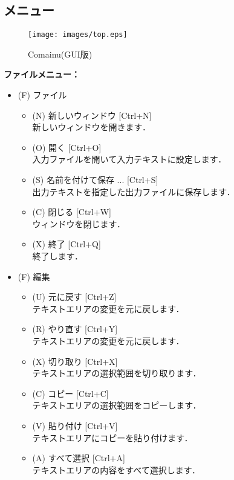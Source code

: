 \documentclass[titlepage]{jarticle}
\begin{document}
\subsection{メニュー}

\begin{figure}[!ht]
\begin{center}
\texttt{[image: images/top.eps]}
\caption{Comainu(GUI版)}
\label{top}
\end{center}
\end{figure}

\textbf{ファイルメニュー：}
\begin{itemize}
\item (F) ファイル
\begin{itemize}
\item (N) 新しいウィンドウ [Ctrl+N] \\
新しいウィンドウを開きます．
\item (O) 開く [Ctrl+O] \\
入力ファイルを開いて入力テキストに設定します．
\item (S) 名前を付けて保存 ... [Ctrl+S] \\
出力テキストを指定した出力ファイルに保存します．
\item (C) 閉じる [Ctrl+W] \\
ウィンドウを閉じます．
\item (X) 終了 [Ctrl+Q] \\
終了します．
\end{itemize}
\item (F) 編集
\begin{itemize}
\item (U) 元に戻す [Ctrl+Z] \\
テキストエリアの変更を元に戻します．
\item (R) やり直す [Ctrl+Y] \\
テキストエリアの変更を元に戻します．
\item (X) 切り取り [Ctrl+X] \\
テキストエリアの選択範囲を切り取ります．
\item (C) コピー [Ctrl+C] \\
テキストエリアの選択範囲をコピーします．
\item (V) 貼り付け [Ctrl+V] \\
テキストエリアにコピーを貼り付けます．
\item (A) すべて選択 [Ctrl+A] \\
テキストエリアの内容をすべて選択します．
\end{itemize}

\end{itemize}
\end{document}
